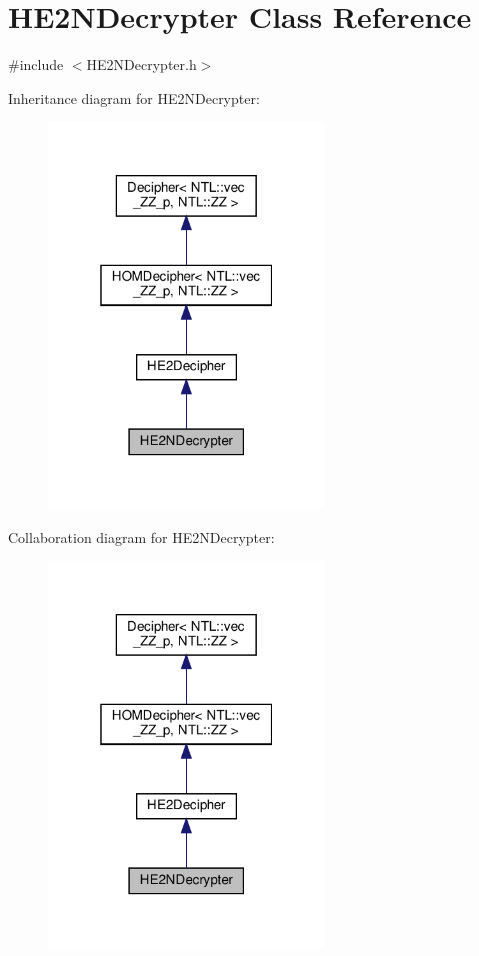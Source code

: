 \hypertarget{classHE2NDecrypter}{}\section{H\+E2\+N\+Decrypter Class Reference}
\label{classHE2NDecrypter}


{\ttfamily \#include $<$H\+E2\+N\+Decrypter.\+h$>$}



Inheritance diagram for H\+E2\+N\+Decrypter\+:\nopagebreak
\begin{figure}[H]
\begin{center}
\leavevmode
\includegraphics[width=208pt]{classHE2NDecrypter__inherit__graph}
\end{center}
\end{figure}


Collaboration diagram for H\+E2\+N\+Decrypter\+:\nopagebreak
\begin{figure}[H]
\begin{center}
\leavevmode
\includegraphics[width=208pt]{classHE2NDecrypter__coll__graph}
\end{center}
\end{figure}
